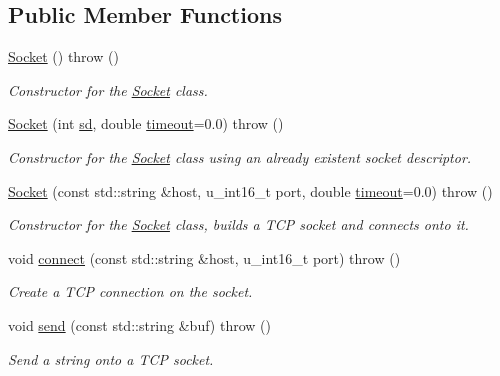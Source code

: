 \subsection*{Public Member Functions}
\begin{CompactItemize}
\item 
\hyperlink{classusock_1_1Socket_41721da25729d31889ad3b3312da8532}{Socket} ()  throw ()
\begin{CompactList}\small\item\em Constructor for the \hyperlink{classusock_1_1Socket}{Socket} class. \item\end{CompactList}\item 
\hyperlink{classusock_1_1Socket_157cd31365e1b52709a4abc2c9d7eb05}{Socket} (int \hyperlink{classusock_1_1BaseSocket_63b6c07fb14f937056148cbf8b3531c5}{sd}, double \hyperlink{classusock_1_1BaseSocket_b419e8fd0b849c74b73a02d6bd9081e3}{timeout}=0.0)  throw ()
\begin{CompactList}\small\item\em Constructor for the \hyperlink{classusock_1_1Socket}{Socket} class using an already existent socket descriptor. \item\end{CompactList}\item 
\hyperlink{classusock_1_1Socket_12fa74b5a9eebcea247aa00a1236c0ee}{Socket} (const std::string \&host, u\_\-int16\_\-t port, double \hyperlink{classusock_1_1BaseSocket_b419e8fd0b849c74b73a02d6bd9081e3}{timeout}=0.0)  throw ()
\begin{CompactList}\small\item\em Constructor for the \hyperlink{classusock_1_1Socket}{Socket} class, builds a TCP socket and connects onto it. \item\end{CompactList}\item 
void \hyperlink{classusock_1_1Socket_2036f820d8973a3e4a7cd9c60d6a5a24}{connect} (const std::string \&host, u\_\-int16\_\-t port)  throw ()
\begin{CompactList}\small\item\em Create a TCP connection on the socket. \item\end{CompactList}\item 
void \hyperlink{classusock_1_1Socket_6aa18c3c0131c826afe790a4c8c7aa77}{send} (const std::string \&buf)  throw ()
\begin{CompactList}\small\item\em Send a string onto a TCP socket. \item\end{CompactList}\item 

\end{CompactItemize}
